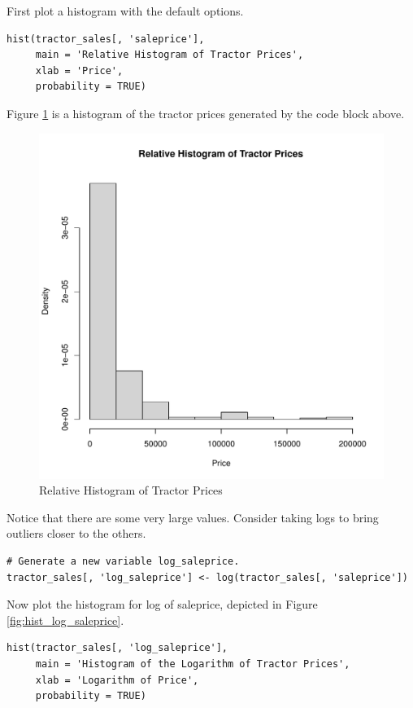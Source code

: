 \documentclass[11pt]{book}
\begin{document}
First plot a histogram with the default options.

\begin{verbatim}
hist(tractor_sales[, 'saleprice'],
     main = 'Relative Histogram of Tractor Prices',
     xlab = 'Price',
     probability = TRUE)
\end{verbatim}


Figure \ref{fig:hist_saleprice} is
a histogram of the tractor prices
generated by the code block above.
%
\begin{figure}[h!]
  \centering
  \includegraphics[scale = 0.5, keepaspectratio=true]{../Figures/hist_saleprice}
  \caption{Relative Histogram of Tractor Prices} \label{fig:hist_saleprice}
\end{figure}
%
%
Notice that there are some very large values.
Consider taking logs to bring outliers closer to the others.

\begin{verbatim}
# Generate a new variable log_saleprice.
tractor_sales[, 'log_saleprice'] <- log(tractor_sales[, 'saleprice'])
\end{verbatim}

Now plot the histogram for log of saleprice,
depicted in Figure \ref{fig:hist_log_saleprice}.

\begin{verbatim}
hist(tractor_sales[, 'log_saleprice'],
     main = 'Histogram of the Logarithm of Tractor Prices',
     xlab = 'Logarithm of Price',
     probability = TRUE)
\end{verbatim}
\end{document}
